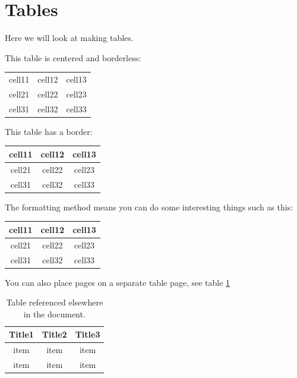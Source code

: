 \documentclass[12pt, letterpaper]{article}
\begin{document}
\newpage
\section{Tables}
Here we will look at making tables\cite{tables}.

This table is centered and borderless:
\begin{center}
\begin{tabular}{ c c c }
    cell11 & cell12 & cell13 \\
    cell21 & cell22 & cell23 \\
    cell31 & cell32 & cell33
\end{tabular}
\end{center}

This table has a border:
\begin{center}
\begin{tabular}{ |c|c|c| }
    \hline
    cell11 & cell12 & cell13 \\
    \hline
    cell21 & cell22 & cell23 \\
    cell31 & cell32 & cell33 \\
    \hline
\end{tabular}
\end{center}

The formatting method means you can do some interesting things such as this:
\begin{center}
\begin{tabular}{ ||c c c||}
    \hline
    cell11 & cell12 & cell13 \\
    \hline\hline
    cell21 & cell22 & cell23 \\
    cell31 & cell32 & cell33 \\
    \hline
\end{tabular}
\end{center}

You can also place pages on a separate table page, see table \ref{table:1}
\begin{table}[p!]
\centering
\begin{tabular}{ ||c|c|c||}
    \hline
    Title1 & Title2 & Title3 \\
    \hline\hline
    item & item & item \\
    item & item & item \\
    \hline
\end{tabular}
\caption{Table referenced elsewhere in the document.}
\label{table:1}
\end{table}

\newpage
\printbibliography
\end{document}
